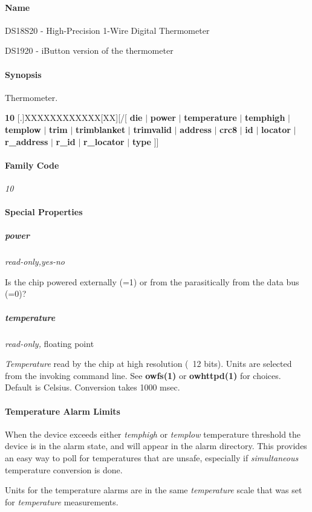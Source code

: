 \paragraph*{Name}
DS18S20 - High-Precision 1-Wire Digital Thermometer 

DS1920 - iButton version of the thermometer 
\paragraph*{Synopsis}
Thermometer. 

\textbf{10} [.]XXXXXXXXXXXX[XX][/[
\textbf{die} $|$ \textbf{power} $|$ \textbf{temperature} $|$ \textbf{temphigh} $|$ \textbf{templow} $|$ \textbf{trim} $|$ \textbf{trimblanket} $|$ \textbf{trimvalid}
$|$           \textbf{address} $|$ \textbf{crc8} $|$ \textbf{id} $|$ \textbf{locator} $|$ \textbf{r\_address} $|$ \textbf{r\_id} $|$ \textbf{r\_locator} $|$ \textbf{type}
 ]] 
\paragraph*{Family Code}


\textit{10} 
\paragraph*{Special Properties}

\subparagraph*{power}\textit{read-only,yes-no} 

Is the chip powered externally (=1) or from the parasitically from the
data bus (=0)? 
\subparagraph*{temperature}\textit{read-only,} floating point 

\textit{Temperature} read by the chip at high resolution (~12 bits). Units are selected
from the invoking command line. See \textsf{\textbf{owfs(1)}} or \textsf{\textbf{owhttpd(1)}} for choices. Default
is Celsius. Conversion takes 1000 msec. 
\paragraph*{Temperature Alarm Limits}
When the
device exceeds either \textit{temphigh} or \textit{templow} temperature threshold the device
is in the alarm state, and will appear in the alarm directory. This provides
an easy way to poll for temperatures that are unsafe, especially if  \textit{simultaneous}
temperature conversion is done. 

Units for the temperature alarms are in
the same \textit{temperature} scale that was set for \textit{temperature} measurements. 

